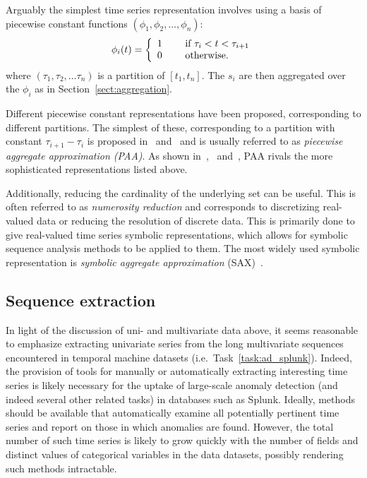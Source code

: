 Arguably the simplest time series representation involves using a basis of piecewise constant functions $(\phi_1, \phi_2, \dots, \phi_n)$:
\[
  \phi_i(t) = \left\{
    \begin{array}{l l}
      1 & \quad \text{ if } \tau_i < t < \tau_{i+1} \\
      0 & \quad \text{ otherwise.} \\
    \end{array} \right.
\]
where $(\tau_1, \tau_2, \dots \tau_n)$ is a partition of $[t_1, t_n]$. The $s_i$ are then aggregated over the $\phi_i$ as in Section~\ref{sect:aggregation}.

Different piecewise constant representations have been proposed, corresponding to different partitions. The simplest of these, corresponding to a partition with constant $\tau_{i+1} - \tau_i$ is proposed in~\cite{keogh4} and~\cite{faloutsos2} and is usually referred to as \emph{piecewise aggregate approximation (PAA)}. As shown in~\cite{keogh5},~\cite{keogh3} and~\cite{faloutsos2}, PAA rivals the more sophisticated representations listed above.

Additionally, reducing the cardinality of the underlying set can be useful. This is often referred to as \emph{numerosity reduction} and corresponds to discretizing real-valued data or reducing the resolution of discrete data. This is primarily done to give real-valued time series symbolic representations, which allows for symbolic sequence analysis methods to be applied to them. The most widely used symbolic representation is \emph{symbolic aggregate approximation} (SAX)~\cite{sax}.

\subsection{Sequence extraction}
\label{sect:series_mining}

In light of the discussion of uni- and multivariate data above, it seems reasonable to emphasize extracting univariate series from the long multivariate sequences encountered in temporal machine datasets (i.e.\ Task~\ref{task:ad_splunk}). Indeed, the provision of tools for manually or automatically extracting interesting time series is likely necessary for the uptake of large-scale anomaly detection (and indeed several other related tasks) in databases such as Splunk. Ideally, methods should be available that automatically examine all potentially pertinent time series and report on those in which anomalies are found. However, the total number of such time series is likely to grow quickly with the number of fields and distinct values of categorical variables in the data datasets, possibly rendering such methods intractable.

